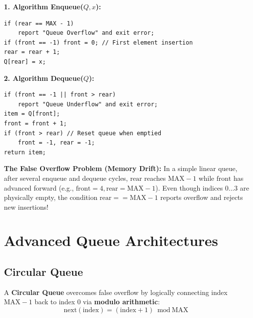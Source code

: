 \documentclass[12pt,a4paper]{article}
\begin{document}
\begin{tcolorbox}[formulabox, title={\textbf{Linear Queue Algorithms and the False Overflow Anomaly}}]
\textbf{1. Algorithm Enqueue($Q, x$):}
\begin{verbatim}
if (rear == MAX - 1)
    report "Queue Overflow" and exit error;
if (front == -1) front = 0; // First element insertion
rear = rear + 1;
Q[rear] = x;
\end{verbatim}

\textbf{2. Algorithm Dequeue($Q$):}
\begin{verbatim}
if (front == -1 || front > rear)
    report "Queue Underflow" and exit error;
item = Q[front];
front = front + 1;
if (front > rear) // Reset queue when emptied
    front = -1, rear = -1;
return item;
\end{verbatim}
\par\vspace{2pt}\noindent
\textbf{The False Overflow Problem (Memory Drift):} In a simple linear queue, after several enqueue and dequeue cycles, $\text{rear}$ reaches $\text{MAX}-1$ while $\text{front}$ has advanced forward (e.g., $\text{front} = 4, \text{rear} = \text{MAX}-1$). Even though indices $0 \dots 3$ are physically empty, the condition $\text{rear} == \text{MAX}-1$ reports overflow and rejects new insertions!
\end{tcolorbox}

\section{Advanced Queue Architectures}

\subsection{Circular Queue}
A \textbf{Circular Queue} overcomes false overflow by logically connecting index $\text{MAX}-1$ back to index $0$ via \textbf{modulo arithmetic}:
\begin{equation}
  \text{next}(\text{index}) = (\text{index} + 1) \bmod \text{MAX}
\end{equation}
\end{document}
